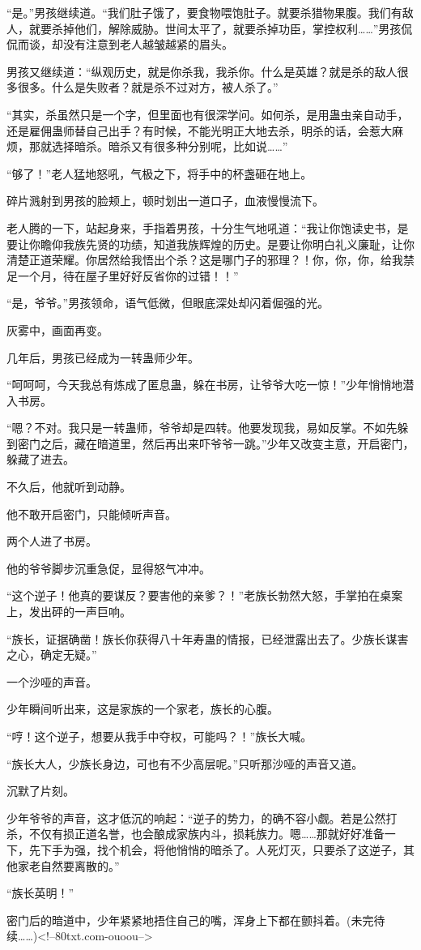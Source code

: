 \begin{this_body}
“是。”男孩继续道。“我们肚子饿了，要食物喂饱肚子。就要杀猎物果腹。我们有敌人，就要杀掉他们，解除威胁。世间太平了，就要杀掉功臣，掌控权利……”男孩侃侃而谈，却没有注意到老人越皱越紧的眉头。

男孩又继续道：“纵观历史，就是你杀我，我杀你。什么是英雄？就是杀的敌人很多很多。什么是失败者？就是杀不过对方，被人杀了。”

“其实，杀虽然只是一个字，但里面也有很深学问。如何杀，是用蛊虫亲自动手，还是雇佣蛊师替自己出手？有时候，不能光明正大地去杀，明杀的话，会惹大麻烦，那就选择暗杀。暗杀又有很多种分别呢，比如说……”

“够了！”老人猛地怒吼，气极之下，将手中的杯盏砸在地上。

碎片溅射到男孩的脸颊上，顿时划出一道口子，血液慢慢流下。

老人腾的一下，站起身来，手指着男孩，十分生气地吼道：“我让你饱读史书，是要让你瞻仰我族先贤的功绩，知道我族辉煌的历史。是要让你明白礼义廉耻，让你清楚正道荣耀。你居然给我悟出个杀？这是哪门子的邪理？！你，你，你，给我禁足一个月，待在屋子里好好反省你的过错！！”

“是，爷爷。”男孩领命，语气低微，但眼底深处却闪着倔强的光。

灰雾中，画面再变。

几年后，男孩已经成为一转蛊师少年。

“呵呵呵，今天我总有炼成了匿息蛊，躲在书房，让爷爷大吃一惊！”少年悄悄地潜入书房。

“嗯？不对。我只是一转蛊师，爷爷却是四转。他要发现我，易如反掌。不如先躲到密门之后，藏在暗道里，然后再出来吓爷爷一跳。”少年又改变主意，开启密门，躲藏了进去。

不久后，他就听到动静。

他不敢开启密门，只能倾听声音。

两个人进了书房。

他的爷爷脚步沉重急促，显得怒气冲冲。

“这个逆子！他真的要谋反？要害他的亲爹？！”老族长勃然大怒，手掌拍在桌案上，发出砰的一声巨响。

“族长，证据确凿！族长你获得八十年寿蛊的情报，已经泄露出去了。少族长谋害之心，确定无疑。”

一个沙哑的声音。

少年瞬间听出来，这是家族的一个家老，族长的心腹。

“哼！这个逆子，想要从我手中夺权，可能吗？！”族长大喊。

“族长大人，少族长身边，可也有不少高层呢。”只听那沙哑的声音又道。

沉默了片刻。

少年爷爷的声音，这才低沉的响起：“逆子的势力，的确不容小觑。若是公然打杀，不仅有损正道名誉，也会酿成家族内斗，损耗族力。嗯……那就好好准备一下，先下手为强，找个机会，将他悄悄的暗杀了。人死灯灭，只要杀了这逆子，其他家老自然要离散的。”

“族长英明！”

密门后的暗道中，少年紧紧地捂住自己的嘴，浑身上下都在颤抖着。(未完待续……)<!--80txt.com-ouoou-->

\end{this_body}

